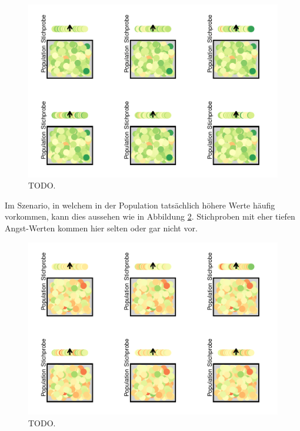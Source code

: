 \documentclass[
]{book}
\theoremstyle{definition}
\theoremstyle{definition}
\theoremstyle{definition}
\theoremstyle{definition}
\theoremstyle{remark}
\begin{document}
\begin{figure}
\centering
\includegraphics{aps_statistik1_files/figure-latex/srs-intervall-high-p-many-1.pdf}
\caption{\label{fig:srs-intervall-high-p-many}TODO.}
\end{figure}

Im Szenario, in welchem in der Population tatsächlich höhere Werte häufig vorkommen, kann dies aussehen wie in Abbildung \ref{fig:srs-intervall-low-p-many}. Stichproben mit eher tiefen Angst-Werten kommen hier selten oder gar nicht vor.

\begin{figure}
\centering
\includegraphics{aps_statistik1_files/figure-latex/srs-intervall-low-p-many-1.pdf}
\caption{\label{fig:srs-intervall-low-p-many}TODO.}
\end{figure}
\end{document}

